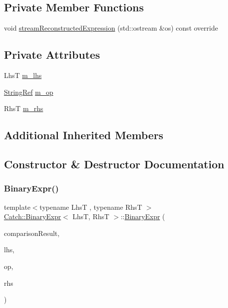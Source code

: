 \subsection*{Private Member Functions}
\begin{DoxyCompactItemize}
\item 
void \mbox{\hyperlink{class_catch_1_1_binary_expr_af998022712d4bd3e4fc7ab9b8a38b445}{stream\+Reconstructed\+Expression}} (std\+::ostream \&os) const override
\end{DoxyCompactItemize}
\subsection*{Private Attributes}
\begin{DoxyCompactItemize}
\item 
LhsT \mbox{\hyperlink{class_catch_1_1_binary_expr_a306b29e77b48f9c538c5031a59adc4ce}{m\+\_\+lhs}}
\item 
\mbox{\hyperlink{class_catch_1_1_string_ref}{String\+Ref}} \mbox{\hyperlink{class_catch_1_1_binary_expr_ab21dea40c53fd64d4f7a073dbe93ec95}{m\+\_\+op}}
\item 
RhsT \mbox{\hyperlink{class_catch_1_1_binary_expr_a54cb1629bf304ebe0c1560f4cc2bc186}{m\+\_\+rhs}}
\end{DoxyCompactItemize}
\subsection*{Additional Inherited Members}


\subsection{Constructor \& Destructor Documentation}
\mbox{\label{class_catch_1_1_binary_expr_a657d66346aef97a760c22776fe6008b6}} 
\subsubsection{\texorpdfstring{BinaryExpr()}{BinaryExpr()}}
{\footnotesize\ttfamily template$<$typename LhsT , typename RhsT $>$ \\
\mbox{\hyperlink{class_catch_1_1_binary_expr}{Catch\+::\+Binary\+Expr}}$<$ LhsT, RhsT $>$\+::\mbox{\hyperlink{class_catch_1_1_binary_expr}{Binary\+Expr}} (\begin{DoxyParamCaption}\item[{bool}]{comparison\+Result,  }\item[{LhsT}]{lhs,  }\item[{\mbox{\hyperlink{class_catch_1_1_string_ref}{String\+Ref}}}]{op,  }\item[{RhsT}]{rhs }\end{DoxyParamCaption})\hspace{0.3cm}{\ttfamily [inline]}}



